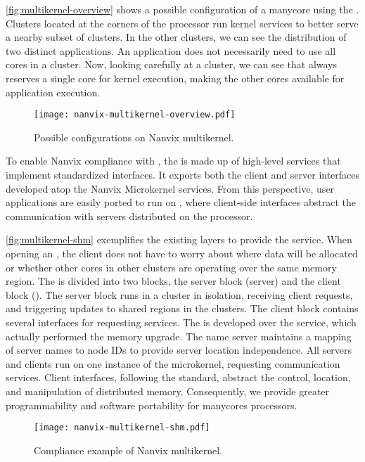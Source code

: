 		\autoref{fig:multikernel-overview} shows a possible configuration of a
		manycore using the \nanvix \multikernel.
		Clusters located at the corners of the processor run kernel services
		to better serve a nearby subset of clusters.
		In the other clusters, we can see the distribution of two distinct applications.
		An application does not necessarily need to use all cores in a cluster.
		Now, looking carefully at a cluster, we can see that \nanvix \microkernel
		always reserves a single core for kernel execution, making the other cores
		available for application execution.

		\begin{figure}[!tb]
			\centering%
			\caption{Possible configurations on Nanvix multikernel.}%
			\label{fig:multikernel-overview}%
			\texttt{[image: nanvix-multikernel-overview.pdf]}%
		\end{figure}

		To enable Nanvix \os compliance with \posix, the \nanvix \multikernel is
		made up of high-level \os services that implement standardized interfaces.
		It exports both the client and server interfaces developed atop	the
		Nanvix Microkernel services.
		From this perspective, user applications are easily ported to run on
		\nanvix \multikernel, where client-side interfaces abstract the communication
		with servers distributed on the processor.
		
		\autoref{fig:multikernel-shm} exemplifies the existing layers to provide
		the \shm service. When opening an \shm, the client does not have to worry
		about where data will be allocated or whether other cores in other clusters
		are operating over the same memory region.
		The \shm is divided into two blocks, the server block (\shm server) and the
		client block (\posix \shm). The server block runs in a cluster in isolation,
		receiving client requests, and triggering updates to shared regions in the
		clusters. The client block contains several interfaces for requesting services.
		The \shm is developed over the \rmem service, which actually performed
		the memory upgrade. The name server maintains a mapping of server names to
		node IDs to provide server location independence. All servers and clients
		run on one instance of the microkernel, \eg requesting communication services.
		Client interfaces, following the \posix standard, abstract the control,
		location, and manipulation of distributed memory.
		Consequently, we provide greater programmability and software portability
		for manycores processors.

		\begin{figure}[!tb]
			\centering%
			\caption{\posix Compliance example of Nanvix multikernel.}%
			\label{fig:multikernel-shm}%
			\texttt{[image: nanvix-multikernel-shm.pdf]}%
		\end{figure}
